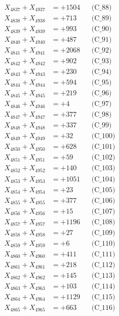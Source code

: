 \documentclass[a4paper,10pt]{article}
\begin{document}
{\begin{align}
X_{4837} + X_{4937} &= +1504 && \text{(C\_88)} \\
X_{4838} + X_{4938} &= +713 && \text{(C\_89)} \\
X_{4839} + X_{4939} &= +993 && \text{(C\_90)} \\
\allowbreak
X_{4840} + X_{4940} &= +487 && \text{(C\_91)} \\
X_{4841} + X_{4941} &= +2068 && \text{(C\_92)} \\
X_{4842} + X_{4942} &= +902 && \text{(C\_93)} \\
X_{4843} + X_{4943} &= +230 && \text{(C\_94)} \\
X_{4844} + X_{4944} &= +594 && \text{(C\_95)} \\
\allowbreak
X_{4845} + X_{4945} &= +219 && \text{(C\_96)} \\
X_{4846} + X_{4946} &= +4 && \text{(C\_97)} \\
X_{4847} + X_{4947} &= +377 && \text{(C\_98)} \\
X_{4848} + X_{4948} &= +337 && \text{(C\_99)} \\
X_{4849} + X_{4949} &= +32 && \text{(C\_100)} \\
\allowbreak
X_{4850} + X_{4950} &= +628 && \text{(C\_101)} \\
X_{4851} + X_{4951} &= +59 && \text{(C\_102)} \\
X_{4852} + X_{4952} &= +140 && \text{(C\_103)} \\
X_{4853} + X_{4953} &= +1051 && \text{(C\_104)} \\
X_{4854} + X_{4954} &= +23 && \text{(C\_105)} \\
\allowbreak
X_{4855} + X_{4955} &= +377 && \text{(C\_106)} \\
X_{4856} + X_{4956} &= +15 && \text{(C\_107)} \\
X_{4857} + X_{4957} &= +1196 && \text{(C\_108)} \\
X_{4858} + X_{4958} &= +27 && \text{(C\_109)} \\
X_{4859} + X_{4959} &= +6 && \text{(C\_110)} \\
\allowbreak
X_{4860} + X_{4960} &= +411 && \text{(C\_111)} \\
X_{4861} + X_{4961} &= +218 && \text{(C\_112)} \\
X_{4862} + X_{4962} &= +145 && \text{(C\_113)} \\
X_{4863} + X_{4963} &= +103 && \text{(C\_114)} \\
X_{4864} + X_{4964} &= +1129 && \text{(C\_115)} \\
\allowbreak
X_{4865} + X_{4965} &= +663 && \text{(C\_116)} \\

\end{align}}
\end{document}
